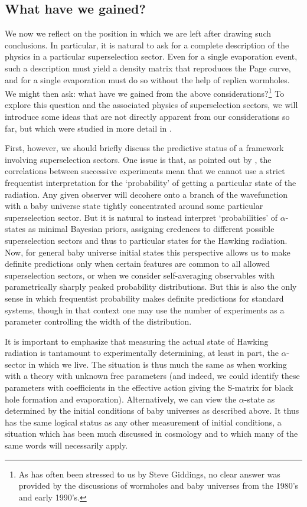 \documentclass[letterpaper,12pt]{article}
\begin{document}
\subsection{What have we gained?}
\label{sec:disc2}

We now we reflect on the position in which we are left after drawing such conclusions. In particular, it is natural to ask for a complete description of the physics in a particular superselection sector. Even for a single evaporation event, such a description must yield a density matrix that reproduces the Page curve, and for a single evaporation must do so without the help of replica wormholes.   We might then ask: what have we gained from the above considerations?\footnote{As has often been stressed to us by Steve Giddings, no clear answer was provided by the discussions of wormholes and baby universes from the 1980's and early 1990's.} To explore this question and the associated physics of superselection sectors, we will introduce some ideas that are not directly apparent from our considerations so far, but which were studied in more detail in \cite{Marolf:2020xie}.

First, however, we should briefly discuss the predictive status of a framework involving superselection sectors.  One issue is that, as pointed out by \cite{Susskind:1994cv}, the correlations between successive experiments mean that we cannot use a strict frequentist interpretation for the `probability' of getting a particular state of the radiation. Any given observer will decohere onto a branch of the wavefunction with a baby universe state tightly concentrated around some particular superselection sector. But it is natural to instead interpret `probabilities' of $\alpha$-states as minimal Bayesian priors, assigning credences to different possible superselection sectors and thus to particular states for the Hawking radiation.  Now, for general baby universe initial states this perspective allows us to make definite predictions only when certain features are common to all allowed superselection sectors, or when we consider self-averaging observables with parametrically sharply peaked probability distributions.  But this is also the only sense in which frequentist probability makes definite predictions for standard systems, though in that context one may use the number of experiments as a parameter controlling the width of the distribution.

It is important to emphasize that measuring the actual state of Hawking radiation is tantamount to experimentally determining, at least in part, the $\alpha$-sector in which we live. The situation is thus much the same as when working with a theory with unknown free parameters (and indeed, we could identify these parameters with coefficients in the effective action giving the S-matrix for black hole formation and evaporation). Alternatively, we can view the $\alpha$-state as determined by the initial conditions of baby universes as described above.  It thus has the same logical status as any other measurement of initial conditions, a situation which has been much discussed in cosmology and to which many of the same words will necessarily apply.
\end{document}
